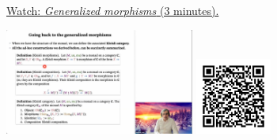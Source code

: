 
\begin{minipage}{10cm}
    \href{https://act4e-spring21.netlify.app/videos/spring2021-monads-a:generalized-morphisms.html}{Watch: \emph{Generalized morphisms} (3 minutes).}
        
    \href{https://act4e-spring21.netlify.app/videos/spring2021-monads-a:generalized-morphisms.html}{\includegraphics[height=3.5cm]{spring2021-monads-a:generalized-morphisms/thumbnails.jpg}}
    \href{https://act4e-spring21.netlify.app/videos/spring2021-monads-a:generalized-morphisms.html}{\includegraphics[height=2.5cm]{spring2021-monads-a:generalized-morphisms/qrcode.png}}
\end{minipage}
